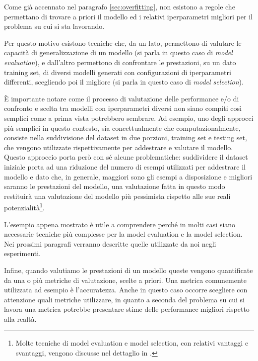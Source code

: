 \documentclass[../../main.tex]{subfiles}
\begin{document}
    Come già accennato nel paragrafo \ref{sec:overfitting}, non esistono a regole che permettano di trovare a priori il modello ed i relativi iperparametri migliori per il problema su cui si sta lavorando.

    Per questo motivo esistono tecniche che, da un lato, permettono di valutare le capacità di generalizzazione di un modello (si parla in questo caso di \textit{model evaluation}), e dall'altro permettono di confrontare le prestazioni, su un dato training set, di diversi modelli generati con configurazioni di iperparametri differenti, scegliendo poi il migliore (si parla in questo caso di \textit{model selection}).
   
    È importante notare come il processo di valutazione delle performance e/o di confronto e scelta tra modelli con iperparametri diversi non siano compiti così semplici come a prima vista potrebbero sembrare. Ad esempio, uno degli approcci più semplici in questo contesto, sia concettualmente che computazionalmente, consiste nella suddivisione del dataset in due porzioni, training set e testing set, che vengono utilizzate rispettivamente per addestrare e valutare il modello.\\
    Questo approccio porta però con sé alcune problematiche: suddividere il dataset iniziale porta ad una riduzione del numero di esempi utilizzati per addestrare il modello e dato che, in generale, maggiori sono gli esempi a disposizione e migliori saranno le prestazioni del modello, una valutazione fatta in questo modo restituirà una valutazione del modello più pessimista rispetto alle sue reali potenzialità\footnote{Molte tecniche di model evaluation e model selection, con relativi vantaggi e svantaggi, vengono discusse nel dettaglio in \cite{raschka2020model}.}.

    L'esempio appena mostrato è utile a comprendere perché in molti casi siano necessarie tecniche più complesse per la model evaluation e la model selection. Nei prossimi paragrafi verranno descritte quelle utilizzate da noi negli esperimenti.

    Infine, quando valutiamo le prestazioni di un modello queste vengono quantificate da una o più metriche di valutazione, scelte a priori. Una metrica comunemente utilizzata ad esempio è l'accuratezza. Anche in questo caso occorre scegliere con attenzione quali metriche utilizzare, in quanto a seconda del problema su cui si lavora una metrica potrebbe presentare stime delle performance migliori rispetto alla realtà.
\end{document}

